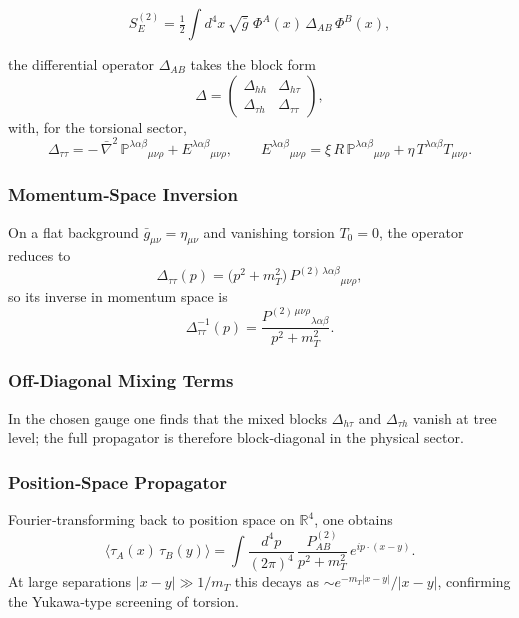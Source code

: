 \documentclass{article}
\begin{document}
\begin{equation}
  S_E^{(2)}
  = \tfrac12\int d^4x\,\sqrt{\bar g}\;
    \Phi^A(x)\,\Delta_{AB}\,\Phi^B(x),
\end{equation}


the differential operator \(\Delta_{AB}\) takes the block form
\begin{equation}\label{eq:auto89}
\Delta = 
  \begin{pmatrix}
    \Delta_{hh} & \Delta_{h\tau}\\
    \Delta_{\tau h} & \Delta_{\tau\tau}
  \end{pmatrix},
\end{equation}
with, for the torsional sector,
\begin{equation}\label{eq:auto90}
\Delta_{\tau\tau}
  = -\,\bar\nabla^2\,\mathbb{P}^{\lambda\alpha\beta}{}_{\mu\nu\rho}
    + E^{\lambda\alpha\beta}{}_{\mu\nu\rho},\qquad
  E^{\lambda\alpha\beta}{}_{\mu\nu\rho}
  = \xi\,R\,\mathbb{P}^{\lambda\alpha\beta}{}_{\mu\nu\rho}
    + \eta\,T^{\lambda\alpha\beta}T_{\mu\nu\rho}.
\end{equation}

\subsubsection{Momentum‐Space Inversion}
On a flat background \(\bar g_{\mu\nu}=\eta_{\mu\nu}\) and vanishing torsion
\(T_0=0\), the operator reduces to
\begin{equation}\label{eq:auto91}
\Delta_{\tau\tau}(p)
  = \bigl(p^2 + m_T^2\bigr)\,
    P^{(2)\,\lambda\alpha\beta}{}_{\mu\nu\rho},
\end{equation}
so its inverse in momentum space is
\begin{equation}\label{eq:auto92} 
\Delta^{-1}_{\tau\tau}(p)
  = \frac{P^{(2)\,\mu\nu\rho}{}_{\lambda\alpha\beta}}{p^2 + m_T^2}.
\end{equation}

\subsubsection{Off‐Diagonal Mixing Terms}
In the chosen gauge one finds that the mixed blocks
\(\Delta_{h\tau}\) and \(\Delta_{\tau h}\) vanish at tree level; the full
propagator is therefore block‑diagonal in the physical sector.

\subsubsection{Position‐Space Propagator}
Fourier‑transforming back to position space on \(\mathbb R^4\), one obtains
\begin{equation}\label{eq:auto93}
\langle \tau_{A}(x)\,\tau_{B}(y)\rangle
  = \int\!\frac{d^4p}{(2\pi)^4}\,
    \frac{P^{(2)}_{AB}}{p^2 + m_T^2}\,e^{i p\cdot(x-y)}.
\end{equation}
At large separations \(|x-y|\gg1/m_T\) this decays as
\(\sim e^{-m_T|x-y|}/|x-y|\), confirming the Yukawa‐type screening of torsion.
\end{document}
